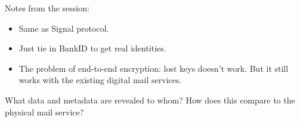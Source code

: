 Notes from the session:
\begin{itemize}
  \item Same as Signal protocol.
  \item Just tie in BankID to get real identities.
  \item The problem of end-to-end encryption: lost keys doesn't work. But it 
    still works with the existing digital mail services.
\end{itemize}

\begin{frame}
  \begin{exercise}
    What data and metadata are revealed to whom?
    How does this compare to the physical mail service?
  \end{exercise}
\end{frame}

